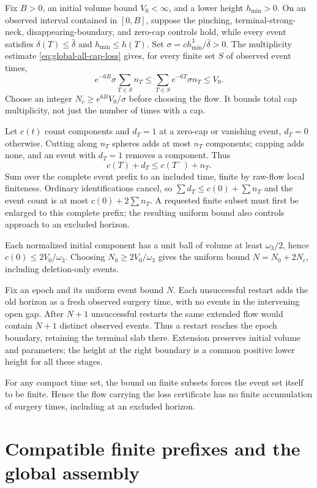 Fix $B>0$, an initial volume bound $V_0<\infty$, and a lower height
$h_{\min}>0$.  On an observed interval contained in $[0,B]$, suppose the
pinching, terminal-strong-neck, disappearing-boundary, and zero-cap controls
hold, while every event satisfies $\delta(T)\leq\bar\delta$ and
$h_{\min}\leq h(T)$.  Set $\sigma=c h_{\min}^3/\bar\delta>0$.
The multiplicity estimate \eqref{eq:global-all-cap-loss} gives, for every
finite set $S$ of observed event times,
\[
 e^{-6B}\sigma\sum_{T\in S}n_T
 \leq\sum_{T\in S} e^{-6T}\sigma n_T\leq V_0.
\]
Choose an integer $N_c\geq e^{6B}V_0/\sigma$ before choosing the flow.
It bounds total cap multiplicity, not just the number of times with a cap.

Let $c(t)$ count components and $d_T=1$ at a zero-cap or vanishing event,
$d_T=0$ otherwise. Cutting along $n_T$ spheres adds at most $n_T$ components;
capping adds none, and an event with $d_T=1$ removes a component. Thus
\[
 c(T)+d_T\leq c(T^-)+n_T.
\]
Sum over the complete event prefix to an included time, finite by raw-flow
local finiteness. Ordinary identifications cancel, so
$\sum d_T\leq c(0)+\sum n_T$ and the event count is at most
$c(0)+2\sum n_T$. A requested finite subset must first be enlarged to
this complete prefix; the resulting uniform bound also controls approach
to an excluded horizon.

Each normalized initial component has a unit ball of volume at least
$\omega_3/2$, hence $c(0)\leq2V_0/\omega_3$. Choosing
$N_0\geq2V_0/\omega_3$ gives the uniform bound $N=N_0+2N_c$,
including deletion-only events.

Fix an epoch and its uniform event bound $N$. Each unsuccessful restart
adds the old horizon as a fresh observed surgery time, with no events in
the intervening open gap. After $N+1$ unsuccessful restarts the same
extended flow would contain $N+1$ distinct observed events. Thus a restart
reaches the epoch boundary, retaining the terminal slab there. Extension
preserves initial volume and parameters; the height at the right boundary
is a common positive lower height for all these stages.

For any compact time set, the bound on finite subsets forces the event set
itself to be finite. Hence the flow carrying the loss certificate has no
finite accumulation of surgery times, including at an excluded horizon.

\section{Compatible finite prefixes and the global assembly}
\label{sec:global-assembly}

